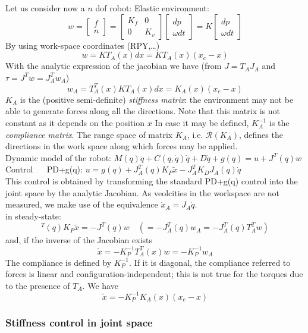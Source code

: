 \documentclass{book}
\begin{document}
Let us consider now a $n$ dof robot: Elastic environment:
\[
    w=\begin{bmatrix}
        f \\ n
    \end{bmatrix}= \begin{bmatrix}
    K_f & 0 \\ 0 & K_v
    \end{bmatrix}\begin{bmatrix}
        dp \\ \omega dt
    \end{bmatrix} = K\begin{bmatrix}
        dp \\ \omega dt
    \end{bmatrix}
\]
By using work-space coordinates (RPY,\dots)
\[
    w = KT_A(x)dx = KT_A(x)(x_e-x)
\]
With the analytic expression of the jacobian we have (from $J=T_AJ_A$ and $\tau=J^Tw=J_A^Tw_A$)
\[
    w_A=T_A^T(x)KT_A(x)dx=K_A(x)(x_e-x)
\]
$K_A$ is the (positive semi-definite) \emph{stiffness matrix}: the environment may not be able to generate forces along all the directions. Note that this matrix is not constant as it depends on the position $x$ In case it may be defined, $K_A^{-1}$ is the \emph{compliance matrix}. The range space of matrix $K_A$, i.e. $\mathcal{R}(K_A)$, defines the directions in the work space along which forces may be applied. \\
Dynamic model of the robot: $M(q)\ddot{q}+C(q,\dot{q})\dot{q}+D\dot{q}+g(q)=u+J^T(q)w$ \\
Control $\quad$ PD+g(q): $u=g(q)+J_A^T(q)K_P\tilde{x}-J_A^TK_DJ_A(q)\dot{q}$\\
This control is obtained by transforming the standard PD+g(q) control into the joint space by the analytic Jacobian. As veolcities in the workspace are not measured, we make use of the equivalence $\dot{x}_A=J_A\dot{q}$.\\
in steady-state:
\[
    ^T(q)K_P\tilde{x}=-J^T(q)w \quad (=-J_A^T(q)w_A=-J_A^T(q)T_A^Tw)
\]
and, if the inverse of the Jacobian exists
\[
    \tilde{x}=-K_P^{-1}T_A^T(x)w = -K_P^{-1}w_A
\]
The compliance is defined by $K_P^{-1}$. If it is diagonal, the compliance referred to forces is linear and configuration-independent; this is not true for the torques due to the presence of $T_A$. 
We have
\[
    \tilde{x}=-K_P^{-1}K_A(x)(x_e-x)
\]
\subsubsection{Stiffness control in joint space}
\end{document}
